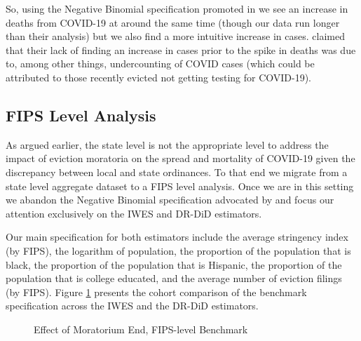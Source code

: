 \documentclass[12pt]{amsart}
\begin{document}
So, using the Negative Binomial specification promoted in  we see an increase in deaths from COVID-19 at around the same time (though our data run longer than their analysis) but we also find a more intuitive increase in cases.  claimed that their lack of finding an increase in cases prior to the spike in deaths was due to, among other things, undercounting of COVID cases (which could be attributed to those recently evicted not getting testing for COVID-19). 

\subsection{FIPS Level Analysis}

As argued earlier, the state level is not the appropriate level to address the impact of eviction moratoria on the spread and mortality of COVID-19 given the discrepancy between local and state ordinances. To that end we migrate from a state level aggregate dataset to a FIPS level analysis. Once we are in this setting we abandon the Negative Binomial specification advocated by  and focus our attention exclusively on the IWES and DR-DiD estimators.  

Our main specification for both estimators include the average stringency index (by FIPS), the logarithm of population, the proportion of the population that is black, the proportion of the population that is Hispanic, the proportion of the population that is college educated, and the average number of eviction filings (by FIPS). Figure \ref{fig:IWESmain} presents the cohort comparison of the benchmark specification across the IWES and the DR-DiD estimators. 

\begin{figure}[H]
    \caption{Effect of Moratorium End, FIPS-level Benchmark}
    \centering     %
{\footnotesize \justifying {} \par}
\label{fig:IWESmain}
\end{figure}
\end{document}
